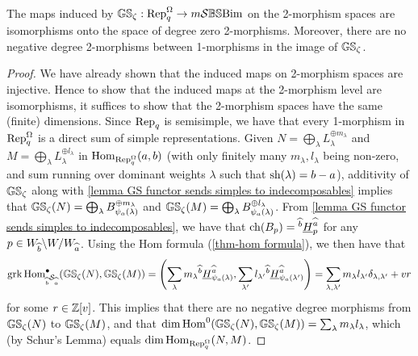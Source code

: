 \begin{lemma}\label{lemma GS  on 2-morphism spaces}
    The maps induced by $\mathbb{GS}_\zeta: \operatorname{Rep}_q^{\Omega} \rightarrow m\mathcal{S}\mathbb{BS}\text{Bim}$ on the 2-morphism spaces are isomorphisms onto the space of degree zero 2-morphisms.
    Moreover, there are no negative degree 2-morphisms between 1-morphisms in the image of $\mathbb{GS}_\zeta$.
\end{lemma}
\begin{proof}
    We have already shown that the induced maps on 2-morphism spaces are injective. 
    Hence to show that the induced maps at the 2-morphism level are isomorphisms, it suffices to show that the 2-morphism spaces have the same (finite) dimensions.
    Since $\operatorname{Rep}_q$ is semisimple, we have that every 1-morphism in $\operatorname{Rep}_q^{\Omega}$ is a direct sum of simple representations. 
    Given $N=\bigoplus_{\lambda}L_{\lambda}^{\oplus m_\lambda}$ and $M=\bigoplus_\lambda L_{\lambda}^{\oplus l_\lambda}$ in $\operatorname{Hom}_{\operatorname{Rep}_q^{\Omega}}(a,b)$ (with only finitely many $m_\lambda, l_\lambda$ being non-zero, and sum running over dominant weights $\lambda$ such that $\operatorname{sh}(\lambda)=b-a$), additivity of $\mathbb{GS}_\zeta$ along with \cref{lemma GS functor sends simples to indecomposables} implies that $\mathbb{GS}_\zeta(N)=\bigoplus_\lambda B_{\psi_a(\lambda)}^{\oplus m_\lambda}$ and $\mathbb{GS}_\zeta(M)=\bigoplus_{\lambda} B_{\psi_a(\lambda)}^{\oplus l_\lambda}$.
    From \cref{lemma GS functor sends simples to indecomposables}, we have that $\operatorname{ch}(B_p)={}^{\widehat{b}}\underline{H}^{\widehat{a}}_{p}$ for any $p \in W_{\widehat{b}}\backslash W/W_{\widehat{a}}$.
    Using the Hom formula (\cref{thm-hom formula}), we then have that 
    $$\operatorname{grk} \operatorname{Hom}^\bullet_{{}_{\widehat{b}}\mathcal{S}_{\widehat{a}}}(\mathbb{GS}_\zeta(N),\mathbb{GS}_\zeta(M))
    = \left(\sum_{\lambda} m_\lambda {}^{\widehat{b}}\underline{H}^{\widehat{a}}_{\psi_a(\lambda)}, \sum_{\lambda'} l_{\lambda'} {}^{\widehat{b}}\underline{H}^{\widehat{a}}_{\psi_a(\lambda')}\right)
    =\sum_{\lambda, \lambda'}m_\lambda l_{\lambda'}\delta_{\lambda, \lambda'} + vr$$
    for some $r \in \mathbb{Z}[v]$. 
    This implies that there are no negative degree morphisms from $\mathbb{GS}_\zeta(N)$ to $\mathbb{GS}_\zeta(M)$, and that $\dim \operatorname{Hom}^0(\mathbb{GS}_\zeta(N),\mathbb{GS}_\zeta(M))=\sum_{\lambda} m_\lambda l_\lambda$, 
    which (by Schur's Lemma) equals
    $\dim \operatorname{Hom}_{\operatorname{Rep}_q^{\Omega}}(N,M)$.
\end{proof}

